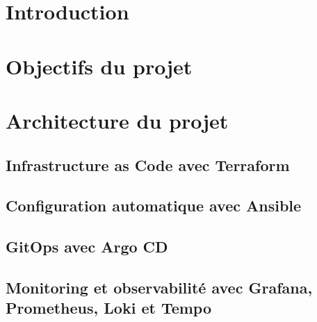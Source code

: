 \section{Introduction}


\section{Objectifs du projet}


\section{Architecture du projet}


\subsection{Infrastructure as Code avec Terraform}


\subsection{Configuration automatique avec Ansible}


\subsection{GitOps avec Argo CD}


\subsection{Monitoring et observabilité avec Grafana, Prometheus, Loki et Tempo}


